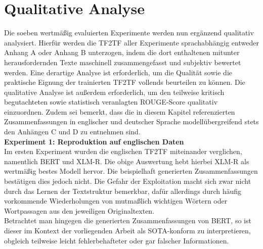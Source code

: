 \section{Qualitative Analyse}
\noindent
Die soeben wertmäßig evaluierten Experimente werden nun ergänzend qualitativ analysiert. Hierfür werden die \ac{TF2TF} aller Experimente sprachabhängig entweder Anhang A oder Anhang B unterzogen, indem die dort enthaltenen mitunter herausfordernden Texte maschinell zusammengefasst und subjektiv bewertet werden. Eine derartige Analyse ist erforderlich, um die Qualität sowie die praktische Eignung der trainierten \ac{TF2TF} vollends beurteilen zu können. Die qualitative Analyse ist außerdem erforderlich, um den teilweise kritisch begutachteten sowie statistisch veranlagten \ac{ROUGE}-Score qualitativ einzuordnen. Zudem sei bemerkt, dass die in diesem Kapitel referenzierten Zusammenfassungen in englischer und deutscher Sprache modellübergreifend stets den Anhängen C und D zu entnehmen sind.\\

\noindent
\textbf{Experiment 1: Reproduktion auf englischen Daten}\\
\noindent
Im ersten Experiment wurden die englischen \ac{TF2TF} miteinander verglichen, namentlich \ac{BERT} und \ac{XLM-R}. Die obige Auswertung hebt hierbei \ac{XLM-R} als wertmäßig bestes Modell hervor. Die beispielhaft generierten Zusammenfassungen bestätigen dies jedoch nicht. Die Gefahr der Exploitation macht sich zwar nicht durch das Lernen der Textstruktur bemerkbar, dafür allerdings durch häufig vorkommende Wiederholungen von mutmaßlich wichtigen Wörtern oder Wortpassagen aus den jeweiligen Originaltexten.\\

\noindent
Betrachtet man hingegen die generierten Zusammenfassungen von \ac{BERT}, so ist dieser im Kontext der vorliegenden Arbeit als \ac{SOTA}-konform zu interpretieren, obgleich teilweise leicht fehlerbehafteter oder gar falscher Informationen.\\

